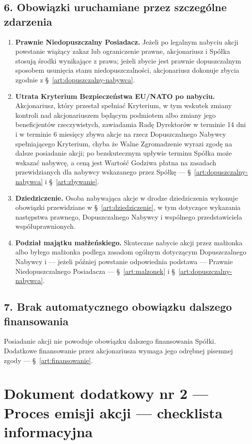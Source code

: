 \documentclass[12pt,a4paper]{report}
\begin{document}
\subsection*{6. Obowiązki uruchamiane przez szczególne zdarzenia}
\begin{enumerate}
  \item \textbf{Prawnie Niedopuszczalny Posiadacz.} Jeżeli po legalnym nabyciu akcji powstanie wiążący zakaz lub ograniczenie prawne, akcjonariusz i Spółka stosują środki wynikające z prawa; jeżeli zbycie jest prawnie dopuszczalnym sposobem usunięcia stanu niedopuszczalności, akcjonariusz dokonuje zbycia zgodnie z §~\ref{art:dopuszczalny-nabywca}.
  \item \textbf{Utrata Kryterium Bezpieczeństwa EU/NATO po nabyciu.} Akcjonariusz, który przestał spełniać Kryterium, w tym wskutek zmiany kontroli nad akcjonariuszem będącym podmiotem albo zmiany jego beneficjentów rzeczywistych, zawiadamia Radę Dyrektorów w terminie 14 dni i w terminie 6 miesięcy zbywa akcje na rzecz Dopuszczalnego Nabywcy spełniającego Kryterium, chyba że Walne Zgromadzenie wyrazi zgodę na dalsze posiadanie akcji; po bezskutecznym upływie terminu Spółka może wskazać nabywcę, a ceną jest Wartość Godziwa płatna na zasadach przewidzianych dla nabywcy wskazanego przez Spółkę — §~\ref{art:dopuszczalny-nabywca} i §~\ref{art:zbywanie}.
  \item \textbf{Dziedziczenie.} Osoba nabywająca akcje w drodze dziedziczenia wykonuje obowiązki przewidziane w §~\ref{art:dziedziczenie}, w tym dotyczące wykazania następstwa prawnego, Dopuszczalnego Nabywcy i wspólnego przedstawiciela współuprawnionych.
  \item \textbf{Podział majątku małżeńskiego.} Skuteczne nabycie akcji przez małżonka albo byłego małżonka podlega zasadom ogólnym dotyczącym Dopuszczalnego Nabywcy i — jeżeli później powstanie odpowiednia podstawa — Prawnie Niedopuszczalnego Posiadacza — §~\ref{art:malzonek} i §~\ref{art:dopuszczalny-nabywca}.
\end{enumerate}

\subsection*{7. Brak automatycznego obowiązku dalszego finansowania}
Posiadanie akcji nie powoduje obowiązku dalszego finansowania Spółki. Dodatkowe finansowanie przez akcjonariusza wymaga jego odrębnej pisemnej zgody — §~\ref{art:finansowanie}.


\clearpage
\section*{Dokument dodatkowy nr 2 — Proces emisji akcji — checklista informacyjna}
\label{annex:proces-emisji}
\end{document}

